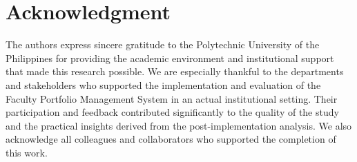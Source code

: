 \documentclass[conference]{IEEEtran}
\begin{document}
\section*{Acknowledgment}
The authors express sincere gratitude to the Polytechnic University of the Philippines for providing the academic environment and institutional support that made this research possible. We are especially thankful to the departments and stakeholders who supported the implementation and evaluation of the Faculty Portfolio Management System in an actual institutional setting. Their participation and feedback contributed significantly to the quality of the study and the practical insights derived from the post-implementation analysis. We also acknowledge all colleagues and collaborators who supported the completion of this work.

\printbibliography
\end{document}
